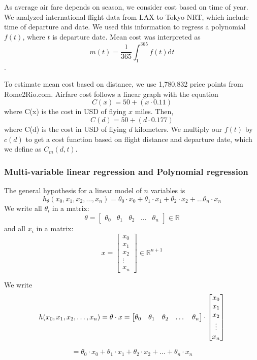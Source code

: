 As average air fare depends on season, we consider cost based on time of year. We analyzed international flight data from LAX to Tokyo NRT, which include time of departure and date. We used this information to regress a polynomial $f(t)$, where $t$ is departure date. Mean cost was interpreted as
$$m(t) = \frac{1}{365} \int_1^{365}f(t) \mathrm{d} t $$. 


To estimate mean cost based on distance, we use 1,780,832 price points from Rome2Rio.com. Airfare cost follows a linear graph with the equation $$C(x) = 50 + (x \cdot 0.11)$$ where C(x) is the cost in USD of flying $x$ miles. Then, $$C(d) = 50 + (d \cdot  0.177)$$ where C(d) is the cost in USD of flying $d$ kilometers. 
We multiply our $f(t)$ by $c(d)$ to get a cost function based on flight distance and departure date, which we define as $C_m(d,t)$.

\subsubsection{Multi-variable linear regression and Polynomial regression}
The general hypothesis for a linear model of $n$ variables is
$$h_{\theta}(x_0, x_1, x_2, \dots, x_n) = \theta_0 \cdot x_0 + \theta_1 \cdot x_1 + \theta_2 \cdot x_2 + \dots  \theta_n \cdot x_n$$
We write all $\theta_i$ in a matrix:
$$
\theta = 
\begin{bmatrix}
\theta_0 & \theta_1 & \theta_2 & \dots & \theta_n 
\end{bmatrix}
\in \mathbb{R}
$$
and all $x_i$ in a matrix:
$$
x = 
\begin{bmatrix}
x_0 \\
x_1 \\
x_2 \\
\vdots\\
x_n
\end{bmatrix}
\in {\mathbb{R}}^{n+1}
$$

We write
$$h(x_0, x_1, x_2, \dots, x_n) = \theta \cdot x \\
= 
\begin{bmatrix}
\theta_0 & \theta_1 & \theta_2 & \dots & \theta_n 
\end{bmatrix}
\cdot
\begin{bmatrix}
x_0 \\
x_1 \\
x_2 \\
\vdots\\
x_n
\end{bmatrix} 
$$

$$= \theta_0 \cdot x_0 + \theta_1 \cdot x_1 + \theta_2 \cdot x_2 + \dots + \theta_n \cdot x_n$$

